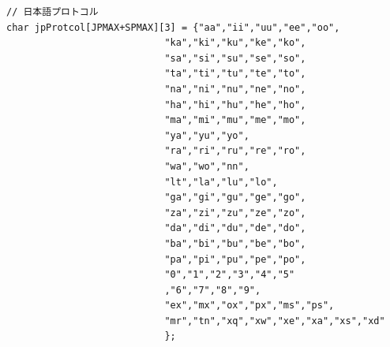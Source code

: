 \documentclass[a4j]{jarticle}
\begin{document}
      \begin{lstlisting}[basicstyle=\ttfamily\footnotesize, frame=single,label=jpProtcolarray,caption=jpProtcol配列]
// 日本語プロトコル
char jpProtcol[JPMAX+SPMAX][3] = {"aa","ii","uu","ee","oo",
                            "ka","ki","ku","ke","ko",
                            "sa","si","su","se","so",
                            "ta","ti","tu","te","to",
                            "na","ni","nu","ne","no",
                            "ha","hi","hu","he","ho",
                            "ma","mi","mu","me","mo",
                            "ya","yu","yo",
                            "ra","ri","ru","re","ro",
                            "wa","wo","nn",
                            "lt","la","lu","lo",
                            "ga","gi","gu","ge","go",
                            "za","zi","zu","ze","zo",
                            "da","di","du","de","do",
                            "ba","bi","bu","be","bo",
                            "pa","pi","pu","pe","po",
                            "0","1","2","3","4","5"
                            ,"6","7","8","9",
                            "ex","mx","ox","px","ms","ps",
                            "mr","tn","xq","xw","xe","xa","xs","xd"
                            };

      \end{lstlisting} 
\end{document}
